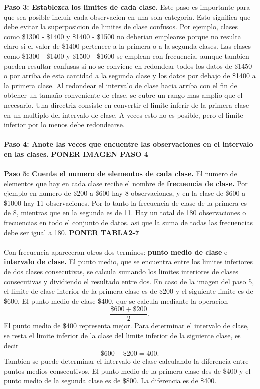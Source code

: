 \documentclass[]{article}
\begin{document}
\textbf{Paso 3: Establezca los limites de cada clase.} Este paso es importante para que sea posible incluir cada observacion en una sola categoria. Esto significa que debe evitar la superposicion de limites de clase confusos. Por ejemplo, clases como \$1300 - \$1400 y \$1400 - \$1500 no deberian emplearse porque no resulta claro si el valor de \$1400 pertenece a la primera o a la segunda clases. Las clases como \$1300 - \$1400 y \$1500 - \$1600 se emplean con frecuencia, aunque tambien pueden resultar confusas si no se conviene en redondear todos los datos de \$1450 o por arriba de esta cantidad a la segunda clase y los datos por debajo de \$1400 a la primera clase. Al redondear el intervalo de clase hacia arriba con el fin de obtener un tamaño conveniente de clase, se cubre un rango mas amplio que el necesario. Una directriz consiste en convertir el limite inferir de la primera clase en un multiplo del intervalo de clase. A veces esto no es posible, pero el limite inferior por lo menos debe redondearse.\\\\
\textbf{Paso 4: Anote las veces que encuentre las observaciones en el intervalo en las clases.}  \textbf{PONER IMAGEN PASO 4}
\\\\\textbf{Paso 5: Cuente el numero de elementos de cada clase.}  El numero de elementos que hay en cada clase recibe el nombre de \textbf{frecuencia de clase.} Por ejemplo en numero de \$200 a \$600 hay 8 observaciones, y en la clase de \$600 a \$1000 hay 11 observaciones. Por lo tanto la frecuencia de clase de la primera es de 8, mientras que en la segunda es de 11. Hay un total de 180 observaciones o frecuencias en todo el conjunto de datos. asi que la suma de todas las frecuencias debe ser igual a 180. \textbf{PONER TABLA2-7}\\\\
Con frecuencia apareceran otros dos terminos: \textbf{punto medio de clase} e \textbf{intervalo de clase.} El punto medio, que se encuentra entre los limites inferiores de dos clases consecutivas, se calcula sumando los limites interiores de clases consecutivas y dividiendo el resultado entre dos. En caso de la imagen del paso 5, el limite de clase interior de la primera clase es de \$200 y el siguiente limite es de \$600. El punto medio de clase \$400, que se calcula mediante la operacion \[ \frac{\$600+\$200}{2} .\] El punto medio de \$400 representa mejor. Para determinar el intervalo de clase, se resta el limite inferior de la clase del limite inferior de la siguiente clase, es decir \[ \$600 -\$200 =400.\]Tambien se puede determinar el intervalo de clase calculando la diferencia entre puntos medios consecutivos. El punto medio de la primera clase des de \$400 y el punto medio de la segunda clase es de \$800. La diferencia es de \$400.
\end{document}
